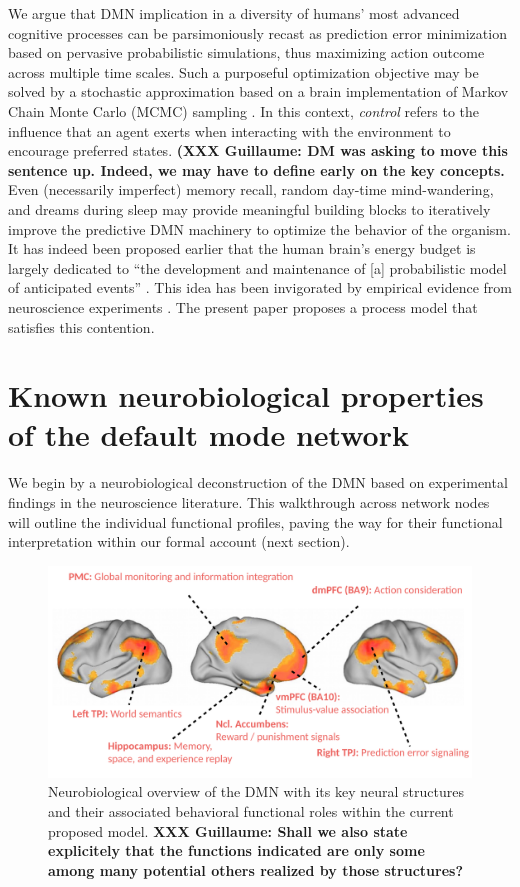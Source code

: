 \documentclass[10pt,letterpaper]{article}
\begin{document}
We argue that DMN implication in a
diversity of humans' most advanced cognitive processes
can be parsimoniously recast as prediction error minimization
based on pervasive probabilistic simulations,
thus maximizing action outcome across multiple time scales.
Such a purposeful optimization objective
may be solved by a stochastic approximation
based on a brain implementation of Markov Chain Monte Carlo (MCMC) sampling
\citep{tenenbaum2011grow}.
In this context,
\textit{control} refers to the influence that an agent exerts when interacting
with the environment to encourage preferred states. \textbf{(XXX Guillaume: DM was asking to move this sentence up. Indeed, we may have to define early on the key concepts.}
Even (necessarily imperfect) memory recall,
random day-time mind-wandering, and dreams during sleep
may provide meaningful building blocks to iteratively improve
the predictive DMN machinery to optimize the behavior of the organism.
%
It has indeed been proposed earlier that
the human brain's energy budget is largely dedicated to
``the development and maintenance of [a]
probabilistic model of anticipated events''
\citep{raichle2005intrinsic}.
This idea has been invigorated by
empirical evidence from
neuroscience experiments \citep{kording2004bayesian, fiser2004small}.
The present paper proposes a
process model that satisfies this contention.




\section{Known neurobiological properties of the default mode network}
We begin by a neurobiological deconstruction of the DMN
based on experimental findings in the neuroscience literature.
This walkthrough across network nodes will
outline the individual functional profiles,
paving the way for their functional interpretation
within our formal account (next section).

\begin{figure}[!h]
  \includegraphics[width=.9\linewidth]{neurobiological_overview_DMN.pdf}
  \caption{Neurobiological overview of the DMN with its key neural structures and their associated behavioral functional roles within the current proposed model. \textbf{XXX Guillaume: Shall we also state explicitely that the functions indicated are only some among many potential others realized by those structures?}}
  \label{fig:neurobiological_overview_DMN}
\end{figure}
%
\end{document}
